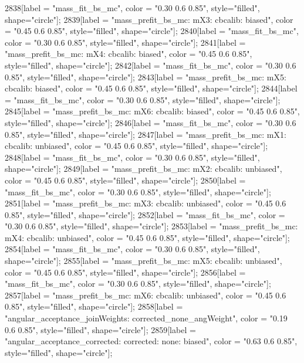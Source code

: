 {	2838[label = "mass_fit_bs_mc", color = "0.30 0.6 0.85", style="filled", shape="circle"];
	2839[label = "mass_prefit_bs_mc\nmassbin: mX3\nmassmodel: cbcalib\ntrigger: biased", color = "0.45 0.6 0.85", style="filled", shape="circle"];
	2840[label = "mass_fit_bs_mc", color = "0.30 0.6 0.85", style="filled", shape="circle"];
	2841[label = "mass_prefit_bs_mc\nmassbin: mX4\nmassmodel: cbcalib\ntrigger: biased", color = "0.45 0.6 0.85", style="filled", shape="circle"];
	2842[label = "mass_fit_bs_mc", color = "0.30 0.6 0.85", style="filled", shape="circle"];
	2843[label = "mass_prefit_bs_mc\nmassbin: mX5\nmassmodel: cbcalib\ntrigger: biased", color = "0.45 0.6 0.85", style="filled", shape="circle"];
	2844[label = "mass_fit_bs_mc", color = "0.30 0.6 0.85", style="filled", shape="circle"];
	2845[label = "mass_prefit_bs_mc\nmassbin: mX6\nmassmodel: cbcalib\ntrigger: biased", color = "0.45 0.6 0.85", style="filled", shape="circle"];
	2846[label = "mass_fit_bs_mc", color = "0.30 0.6 0.85", style="filled", shape="circle"];
	2847[label = "mass_prefit_bs_mc\nmassbin: mX1\nmassmodel: cbcalib\ntrigger: unbiased", color = "0.45 0.6 0.85", style="filled", shape="circle"];
	2848[label = "mass_fit_bs_mc", color = "0.30 0.6 0.85", style="filled", shape="circle"];
	2849[label = "mass_prefit_bs_mc\nmassbin: mX2\nmassmodel: cbcalib\ntrigger: unbiased", color = "0.45 0.6 0.85", style="filled", shape="circle"];
	2850[label = "mass_fit_bs_mc", color = "0.30 0.6 0.85", style="filled", shape="circle"];
	2851[label = "mass_prefit_bs_mc\nmassbin: mX3\nmassmodel: cbcalib\ntrigger: unbiased", color = "0.45 0.6 0.85", style="filled", shape="circle"];
	2852[label = "mass_fit_bs_mc", color = "0.30 0.6 0.85", style="filled", shape="circle"];
	2853[label = "mass_prefit_bs_mc\nmassbin: mX4\nmassmodel: cbcalib\ntrigger: unbiased", color = "0.45 0.6 0.85", style="filled", shape="circle"];
	2854[label = "mass_fit_bs_mc", color = "0.30 0.6 0.85", style="filled", shape="circle"];
	2855[label = "mass_prefit_bs_mc\nmassbin: mX5\nmassmodel: cbcalib\ntrigger: unbiased", color = "0.45 0.6 0.85", style="filled", shape="circle"];
	2856[label = "mass_fit_bs_mc", color = "0.30 0.6 0.85", style="filled", shape="circle"];
	2857[label = "mass_prefit_bs_mc\nmassbin: mX6\nmassmodel: cbcalib\ntrigger: unbiased", color = "0.45 0.6 0.85", style="filled", shape="circle"];
	2858[label = "angular_acceptance_joinWeights\nwflag: corrected_none_angWeight", color = "0.19 0.6 0.85", style="filled", shape="circle"];
	2859[label = "angular_acceptance_corrected\nangacc: corrected\ncsp: none\ntrigger: biased", color = "0.63 0.6 0.85", style="filled", shape="circle"];
}
